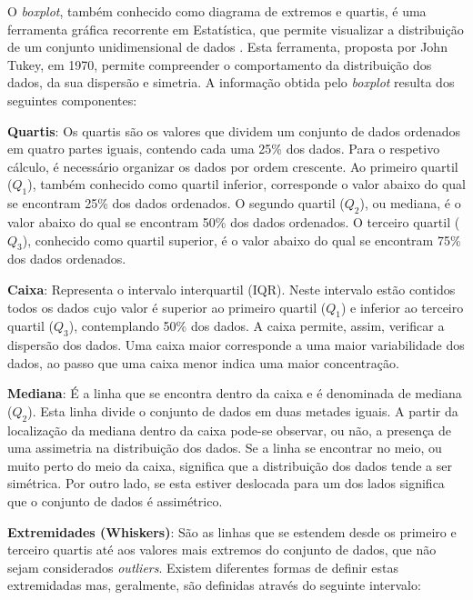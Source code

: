 O \textit{boxplot}, também conhecido como diagrama de extremos e quartis, é uma ferramenta gráfica recorrente em Estatística, que permite visualizar a distribuição de um conjunto unidimensional de dados\cite{casella2002statistical} \cite{ross2014introduction}. Esta ferramenta, proposta por John Tukey, em 1970, permite compreender o comportamento da distribuição dos dados, da sua dispersão e simetria. A informação obtida pelo \textit{boxplot} resulta dos seguintes componentes: 


\begin{my_itemize}
	
	\item \textbf{Quartis}: Os quartis são os valores que dividem um conjunto de dados ordenados em quatro partes iguais, contendo cada uma 25\% dos dados. Para o respetivo cálculo, é necessário organizar os dados por ordem crescente. Ao primeiro quartil ($Q_1$), também conhecido como quartil inferior, corresponde o valor abaixo do qual se encontram 25\% dos dados ordenados. O segundo quartil ($Q_2$), ou mediana, é o valor abaixo do qual se encontram 50\% dos dados ordenados. O terceiro quartil ($Q_3$), conhecido como quartil superior, é o valor abaixo do qual se encontram 75\% dos dados ordenados.
	
	\item \textbf{Caixa}: Representa o intervalo interquartil (IQR). Neste intervalo estão contidos  todos os dados cujo valor é superior ao primeiro quartil ($Q_1$) e inferior ao terceiro quartil ($Q_3$), contemplando 50\% dos dados. A caixa permite, assim, verificar a dispersão dos dados. Uma caixa maior corresponde a uma maior variabilidade dos dados, ao passo que uma caixa menor indica uma maior concentração. 
	
	\item \textbf{Mediana}: É a linha que se encontra dentro da caixa e é denominada de mediana ($Q_2$). Esta linha divide o conjunto de dados em duas metades iguais. A partir da localização da mediana dentro da caixa pode-se observar, ou não, a presença de uma assimetria na distribuição dos dados. Se a linha se encontrar no meio, ou muito perto do meio da caixa, significa que a distribuição dos dados tende a ser simétrica. Por outro lado, se esta estiver deslocada para um dos lados significa que o conjunto de dados é assimétrico. 
	
	\item \textbf{Extremidades (Whiskers)}: São as linhas que se estendem desde os primeiro e terceiro quartis até aos valores mais extremos do conjunto de dados, que não sejam considerados \textit{outliers}. Existem diferentes formas de definir estas extremidadas\cite{spe}  mas, geralmente, são definidas através do seguinte intervalo: 
	

\end{my_itemize}
